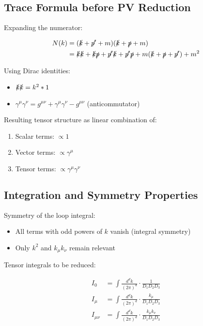 \documentclass[12pt,a4paper]{report}
\begin{document}
	\subsection{Trace Formula before PV Reduction}
	
	Expanding the numerator:
	
	\begin{align}
		N(k) &= (\slashed{k} + \slashed{p'} + m)(\slashed{k} + \slashed{p} + m)\\
		&= \slashed{k}\slashed{k} + \slashed{k}\slashed{p} + \slashed{p'}\slashed{k} + \slashed{p'}\slashed{p} + m(\slashed{k} + \slashed{p} + \slashed{p'}) + m^2
	\end{align}
	
	Using Dirac identities:
	\begin{itemize}
		\item $\slashed{k}\slashed{k} = k^2 \cdot 1$
		\item $\gamma^\mu\gamma^\nu = g^{\mu\nu} + \gamma^\mu\gamma^\nu - g^{\mu\nu}$ (anticommutator)
	\end{itemize}
	
	Resulting tensor structure as linear combination of:
	\begin{enumerate}
		\item Scalar terms: $\propto 1$
		\item Vector terms: $\propto \gamma^\mu$  
		\item Tensor terms: $\propto \gamma^\mu\gamma^\nu$
	\end{enumerate}
	
	\subsection{Integration and Symmetry Properties}
	
	Symmetry of the loop integral:
	\begin{itemize}
		\item All terms with odd powers of $k$ vanish (integral symmetry)
		\item Only $k^2$ and $k_\mu k_\nu$ remain relevant
	\end{itemize}
	
	Tensor integrals to be reduced:
	
	\begin{align}
		I_0 &= \int \frac{d^d k}{(2\pi)^d} \cdot \frac{1}{D_1 D_2 D_3}\\
		I_\mu &= \int \frac{d^d k}{(2\pi)^d} \cdot \frac{k_\mu}{D_1 D_2 D_3}\\
		I_{\mu\nu} &= \int \frac{d^d k}{(2\pi)^d} \cdot \frac{k_\mu k_\nu}{D_1 D_2 D_3}
	\end{align}
	
\end{document}
